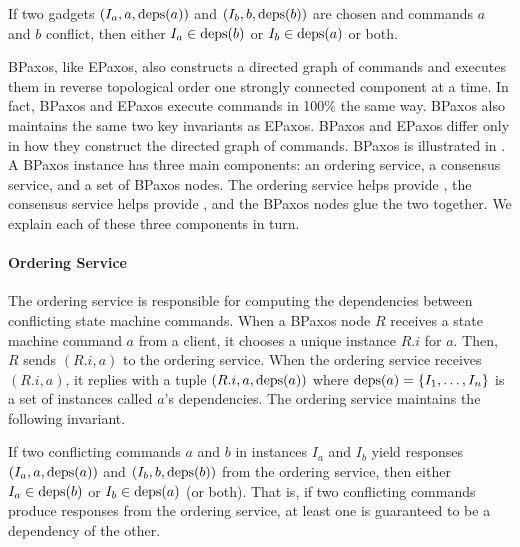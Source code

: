 \begin{boxedinvariant}
  If two gadgets $(I_a, a, \text{deps}(a))$ and $(I_b, b, \text{deps}(b))$ are chosen and
  commands $a$ and $b$ conflict, then either $I_a \in \text{deps}(b)$ or $I_b \in
  \text{deps}(a)$ or both.
\end{boxedinvariant}

BPaxos, like EPaxos, also constructs a directed graph of commands and executes
them in reverse topological order one strongly connected component at a time.
In fact, BPaxos and EPaxos execute commands in 100\% the same way. BPaxos also
maintains the same two key invariants as EPaxos. BPaxos and EPaxos differ only
in how they construct the directed graph of commands.
%
BPaxos is illustrated in . A BPaxos instance has three main
components: an ordering service, a consensus service, and a set of BPaxos
nodes. The ordering service helps provide , the
consensus service helps provide , and the BPaxos nodes
glue the two together. We explain each of these three components in turn.

{}

\paragraph{Ordering Service}
The ordering service is responsible for computing the dependencies between
conflicting state machine commands. When a BPaxos node $R$ receives a state
machine command $a$ from a client, it chooses a unique instance $R.i$ for $a$.
Then, $R$ sends $(R.i, a)$ to the ordering service. When the ordering service
receives $(R.i, a)$, it replies with a tuple $(R.i, a, \text{deps}(a))$ where
$\text{deps}(a) = \{I_1, \ldots, I_n\}$ is a set of instances called $a$'s
dependencies. The ordering service maintains the following invariant.

\begin{boxedinvariant}
If two conflicting commands $a$ and $b$ in instances $I_a$ and $I_b$ yield
responses $(I_a, a, \text{deps}(a))$ and $(I_b, b, \text{deps}(b))$ from the ordering
service, then either $I_a \in \text{deps}(b)$ or $I_b \in \text{deps}(a)$ (or both). That
is, if two conflicting commands produce responses from the ordering service, at
least one is guaranteed to be a dependency of the other.
\end{boxedinvariant}

